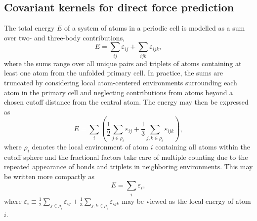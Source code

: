 \documentclass[%
reprint,
superscriptaddress,
amsmath,amssymb,
aps,
prl,
]{revtex4-1}
\begin{document}
\subsection{Covariant kernels for direct force prediction}
The total energy $E$ of a system of atoms in a periodic cell is modelled as a sum over two- and three-body contributions,
\begin{equation}
E = \sum_{ij} \varepsilon_{ij} + \sum_{ijk} \varepsilon_{ijk},
\end{equation}
where the sums range over all unique pairs and triplets of atoms containing at least one atom from the unfolded primary cell. In practice, the sums are truncated by considering local atom-centered environments surrounding each atom in the primary cell and neglecting contributions from atoms beyond a chosen cutoff distance from the central atom. The energy may then be expressed as
\begin{equation}
  E = \sum_{i} \left( \frac{1}{2} \sum_{j \in \rho_i} \varepsilon_{ij} + \frac{1}{3} \sum_{j, k \in \rho_i} \varepsilon_{ijk} \right),
\end{equation}
where $\rho_i$ denotes the local environment of atom $i$ containing all atoms within the cutoff sphere and the fractional factors take care of multiple counting due to the repeated appearance of bonds and triplets in neighboring environments. This may be written more compactly as
\begin{equation}
E = \sum_i \varepsilon_i,
\end{equation}
where $\varepsilon_i \equiv \frac{1}{2} \sum_{j \in \rho_i} \varepsilon_{ij} + \frac{1}{3} \sum_{j, k \in \rho_i} \varepsilon_{ijk}$ may be viewed as the local energy of atom $i$.
\end{document}
